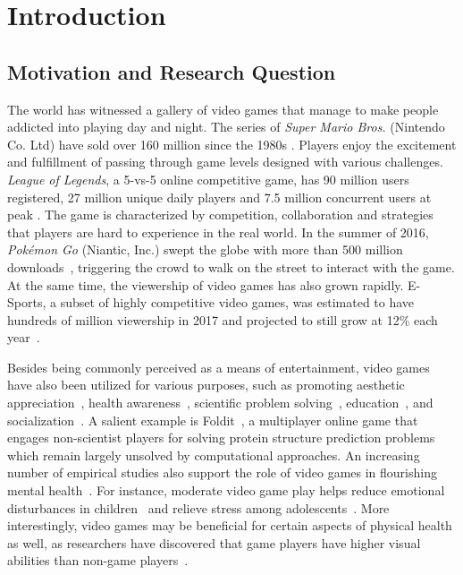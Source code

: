 
\chapter{Introduction} %

\label{chapter:intro} %

\section{Motivation and Research Question}\label{chap1:motiv}

The world has witnessed a gallery of video games that manage to make people addicted into playing day and night. The series of \textit{Super Mario Bros.} (Nintendo Co. Ltd) have sold over 160 million since the 1980s \cite{mariosale}. Players enjoy the excitement and fulfillment of passing through game levels designed with various challenges. \textit{League of Legends}, a 5-vs-5 online competitive game, has 90 million users registered, 27 million unique daily players and 7.5 million concurrent users at peak \cite{lol_fanbase,lol_27million}. The game is characterized by competition, collaboration and strategies that players are hard to experience in the real world. In the summer of 2016, \textit{Pok\'{e}mon Go} (Niantic, Inc.) swept the globe with more than 500 million downloads~\cite{pokemongo}, triggering the crowd to walk on the street to interact with the game. At the same time, the viewership of video games has also grown rapidly. E-Sports, a subset of highly competitive video games, was estimated to have hundreds of million viewership in 2017 and projected to still grow at 12\% each year~\cite{superdata2017}. 

Besides being commonly perceived as a means of entertainment, video games have also been utilized for various purposes, such as promoting aesthetic appreciation~\cite{jarvinen2008understanding}, health awareness~\cite{shiyko2016effects}, scientific problem solving~\cite{cooper2010predicting}, education~\cite{gee2003video}, and socialization~\cite{ferguson2013friends}. A salient example is Foldit~\cite{cooper2010predicting}, a multiplayer online game that engages non-scientist players for solving protein structure prediction problems which remain largely unsolved by computational approaches. An increasing number of empirical studies also support the role of video games in flourishing mental health~\cite{jones2014gaming}. For instance, moderate video game play helps reduce emotional disturbances in children~\cite{hull2009computer} and relieve stress among adolescents~\cite{colwell2007needs}. More interestingly, video games may be beneficial for certain aspects of physical health as well, as researchers have discovered that game players have higher visual abilities than non-game players~\cite{green2003action,li2009enhancing}.

